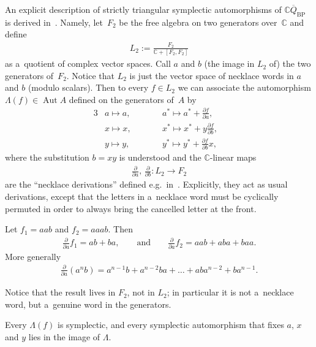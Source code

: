 \documentclass[pdftex]{sigma}
\newcommand{\bb}[1]{\mathbb{#1}}
\newcommand{\app}[3]{#1\colon #2\to #3}
\newcommand{\ol}[1]{\overline{#1}}
\DeclareMathOperator{\Aut}{Aut}
\begin{document}
An explicit description of strictly triangular symplectic automorphisms of \(\bb{C}\ol{Q}_{\mathrm{BP}}\)
is derived in~\cite{bp08}.
Namely, let~\(F_{2}\) be the free algebra on two generators over~\(\bb{C}\) and def\/ine
\begin{gather}
\label{eq:def-L2}
L_{2}\mathrel{:=}\frac{F_{2}}{\bb{C}+[F_{2},F_{2}]}
\end{gather}
as  a~quotient of complex vector spaces.
Call \(a\) and \(b\) (the image in \(L_{2}\) of) the two generators of~\(F_{2}\).
Notice that \(L_{2}\) is just the vector space of necklace words in \(a\) and \(b\) (modulo scalars).
Then to every \(f\in L_{2}\) we can associate the automorphism \(\Lambda(f)\in \Aut A\) def\/ined on the
generators of~\(A\) by
\begin{alignat*}{3}
& a\mapsto a, \qquad && a^{*}\mapsto a^{*}+\frac{\partial f}{\partial a}, &\\
& x\mapsto x, \qquad && x^{*}\mapsto x^{*}+y\frac{\partial f}{\partial b}, & \\
& y\mapsto y, \qquad && y^{*}\mapsto y^{*}+\frac{\partial f}{\partial b}x, &
\end{alignat*}
where the substitution \(b=xy\) is understood and the \(\bb{C}\)-linear maps
\begin{gather*}%
\app{\frac{\partial}{\partial a},\,\frac{\partial}{\partial b}}{L_{2}}{F_{2}}
\end{gather*}
are the ``necklace derivations'' def\/ined e.g.\ in~\cite{blb02, ginz01}.
Explicitly, they act as usual derivations, except that the letters in a~necklace word must be cyclically
permuted in order to always bring the cancelled letter at the front.

\begin{example}
Let $f_1=aab$ and $f_2=aaab$.
Then
\begin{gather*}
\frac{\partial}{\partial a}f_1=ab+ba,\qquad \text{and}\qquad \frac{\partial}{\partial a}f_2=aab+aba+baa.
\end{gather*}
More generally
\begin{gather*}
\frac{\partial}{\partial a}(a^{n}b)=a^{n-1}b+a^{n-2}ba+\dots+aba^{n-2}+ba^{n-1}.
\end{gather*}
\end{example}

Notice that the result lives in \(F_{2}\), not in \(L_{2}\); in particular it is not a~necklace word, but
a~genuine word in the generators.
\begin{theorem}
\label{teo:bp}
Every \(\Lambda(f)\) is symplectic, and every symplectic automorphism that fixes \(a\), \(x\) and \(y\)
lies in the image of \(\Lambda\).
\end{theorem}
\end{document}
